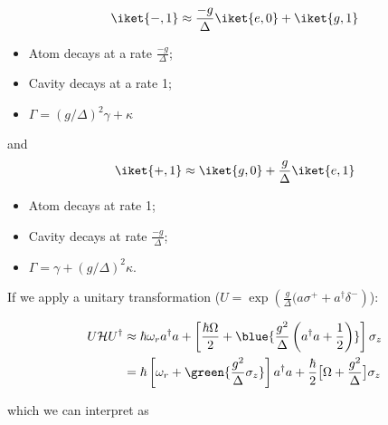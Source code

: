  \begin{equation}
   \iket{-,1} \approx \frac{-g}{\Delta}\iket{e,0} + \iket{g,1}
 \end{equation}

 \begin{itemize}
 \item Atom decays at a rate $\frac{-g}{\Delta}$;
 \item Cavity decays at a rate 1;
 \item $\Gamma = (g/\Delta)^2\gamma+\kappa$
 \end{itemize}

 and
 \begin{equation}
   \iket{+,1} \approx  \iket{g,0}  +
   \frac{g}{\Delta}\iket{e,1}
 \end{equation}

 \begin{itemize}
 \item Atom decays at rate 1;
 \item Cavity decays at rate $\frac{-g}{\Delta}$;
 \item $\Gamma = \gamma+ (g/\Delta)^2\kappa$.
 \end{itemize}

 \noindent    If   we    apply   a    unitary
 transformation
 ($U  = \exp  \left( \frac{g}{\Delta}(a\sigma^+  +
   a^{\dagger}\delta^{-} \right)$):

 \begin{equation}\label{eq:resonator-stark-shift}
   \begin{aligned}
     U\mathcal{H}U^{\dagger} & \approx \hbar\omega_ra^{\dag}a + \left[\frac{\hbar\Omega}{2} + \blue{\frac{g^{2}}{\Delta}\left( a^{\dagger}a + \frac{1}{2} \right)} \right]\sigma_z \\
     &    =     \hbar    \left[     \omega_r    +
       \green{\frac{g^2}{\Delta}\sigma_z}
     \right]a^{\dagger}  a  +  \frac{\hbar}{2}\big[\Omega  +
     \frac{g^2}{\Delta}\big]\sigma_z
   \end{aligned}
 \end{equation}

 \noindent which we can interpret as

